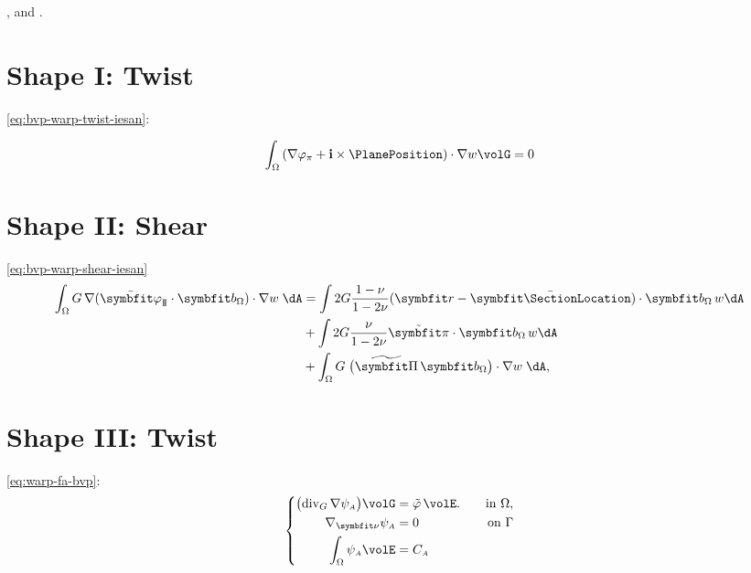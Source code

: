 \cite{pilkey2003analysis}, \cite{lacarbonara2007solution} and \cite{armero2021modeling}.

\section{Shape I: Twist}
\eqref{eq:bvp-warp-twist-iesan}:

$$
\int_{\Omega} \left(\nabla \WarpSVP+\FrameBasis\times\PlanePosition\right) \cdot \nabla w \volG=0
$$

\section{Shape II: Shear}
\eqref{eq:bvp-warp-shear-iesan}
\begin{equation}
\begin{aligned}
\int_{\Section}G\,\nabla(\WarpShearShape\cdot\bm{b}_{\Section})\cdot\nabla w\;\dA
&=\int 2G\frac{1-\nu}{1-2\nu}(\bm{r} - \CentroidLocation)\cdot\bm{b}_{\Section}\, w \dA \\
&+ \int 2G\frac{\nu}{1-2\nu} \tilde{\PlaneShapeStrain}\cdot\bm{b}_{\Section} \, w \dA \\
&+\int_{\Section}G\;\big(\PlaneShearShape\,\bm{b}_{\Section}\big)\cdot\nabla w\;\dA, \\
\end{aligned}
\end{equation}

\section{Shape III: Twist}

\eqref{eq:warp-fa-bvp}:
\begin{equation}
\left\{
\begin{aligned}
\bigl( \DivG\nabla\WarpFA \bigr)\volG
  &=\WarpSV\,\volE.
&\quad\text{in }\Section, \\
\nabla_{\bm{\nu}} \WarpFA &= 0 
&\quad \text{on } \SectionBoundary \\
\int_{\Section} \WarpFA \volE &= \AvgFA
\end{aligned}
\label{eq:apx-warp-fa-bvp}
\right.
\end{equation}
